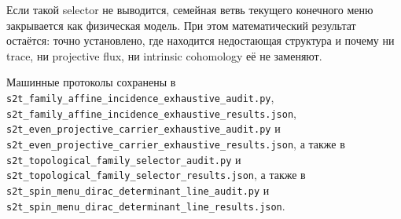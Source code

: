 \documentclass[12pt,a4paper]{article}
\begin{document}
Если такой selector не выводится, семейная ветвь текущего конечного меню
закрывается как физическая модель. При этом математический результат остаётся:
точно установлено, где находится недостающая структура и почему ни trace, ни
projective flux, ни intrinsic cohomology её не заменяют.

Машинные протоколы сохранены в
\texttt{s2t\_family\_affine\_incidence\_exhaustive\_audit.py},
\texttt{s2t\_family\_affine\_incidence\_exhaustive\_results.json},
\texttt{s2t\_even\_projective\_carrier\_exhaustive\_audit.py} и
\texttt{s2t\_even\_projective\_carrier\_exhaustive\_results.json}, а также в
\texttt{s2t\_topological\_family\_selector\_audit.py} и
\texttt{s2t\_topological\_family\_selector\_results.json}, а также в
\texttt{s2t\_spin\_menu\_dirac\_determinant\_line\_audit.py} и
\texttt{s2t\_spin\_menu\_dirac\_determinant\_line\_results.json}.
\end{document}
